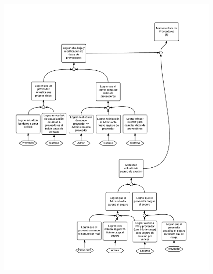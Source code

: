 \begin{figure}[H]
\includegraphics[width=\textwidth, clip=true, trim=15pt 40pt 15pt 40pt]{imagenes/objetivos/objetivos16.pdf}
\end{figure}

\newpage
